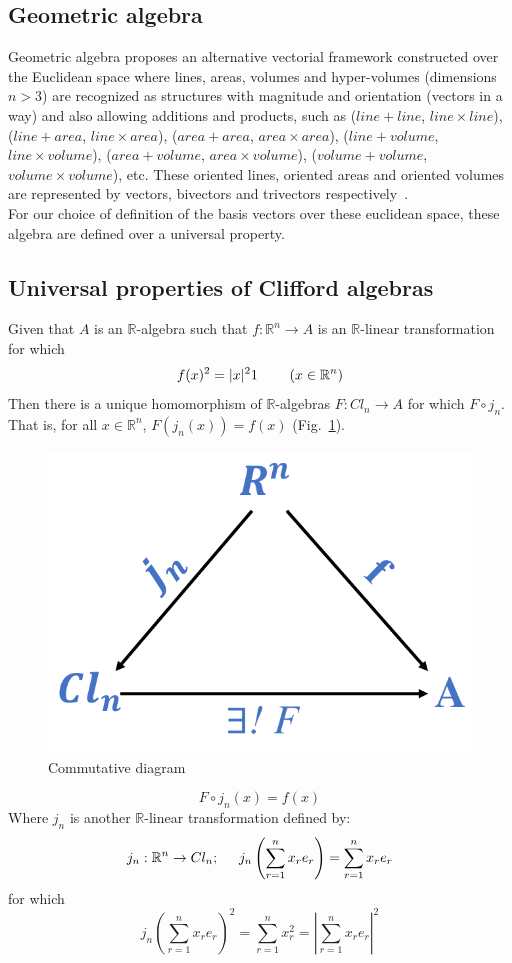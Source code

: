 \documentclass[12pt,onecolumn,letterpaper]{article} %
\begin{document}
\subsection{Geometric algebra}
Geometric algebra proposes an alternative vectorial framework constructed over the Euclidean space where lines, areas, volumes and hyper-volumes (dimensions $n>3$) are recognized as structures with magnitude and orientation (vectors in a way) and also allowing additions and products, such as ($line+line$, $line\times line$), ($line+area$, $line\times area$), ($area+area$, $area\times area$), ($line + volume$, $line\times volume$), ($area + volume$, $area\times volume$), ($volume + volume$, $volume\times volume$), etc. These oriented lines, oriented areas and  oriented volumes are represented by vectors, bivectors and trivectors respectively~\cite{vince2009geometric}. \\
For our choice of definition of the basis vectors over these euclidean space, these algebra are defined over a universal property.
\subsection{Universal properties of Clifford algebras}
Given that $A$ is an $\mathbb {R}$-algebra such that $f:\mathbb {R}^n\rightarrow A$ is an $\mathbb {R}$-linear transformation for which
$$f(x)^2=|x|^21 \hspace{0.8cm} (x\in \mathbb {R}^n)$$
Then there is a unique homomorphism of $\mathbb {R}$-algebras $F:Cl_n\rightarrow A$ for which $F\circ j_n$. That is, for all $x\in \mathbb {R}^n$, $F(j_n(x))=f(x)$ (Fig.~\ref{forceshape}).
\begin{figure}[h]
\centering \includegraphics[width=0.3\linewidth]{PICMSTT}
\caption{Commutative diagram} \label{forceshape}
\end{figure}
\begin{equation}
    F\circ j_n(x)=f(x)
\end{equation}
Where $j_n$ is another $\mathbb {R}$-linear transformation defined by:
\begin{equation}
    j_n:\mathbb {R}^n\rightarrow Cl_n; \hspace{.5cm} j_n\left(\sum_{r=1}^{n}x_re_r\right) = \sum_{r=1}^{n}x_re_r\label{jtransform}
\end{equation}
for which
$$j_n\left(\sum_{r=1}^{n}x_re_r\right)^2 = \sum_{r=1}^{n}x_r^2=\left|\sum_{r=1}^{n}x_re_r\right|^2$$
\end{document}
